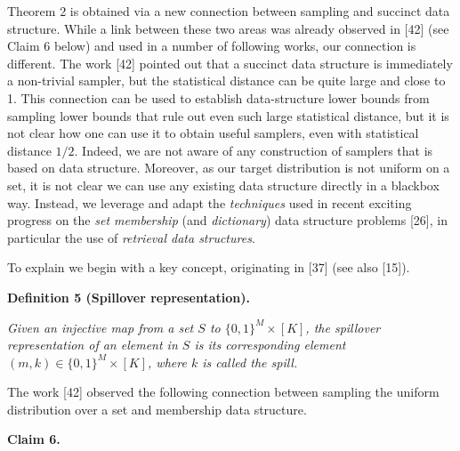 \documentclass[10pt,a4paper]{article}
\begin{document}
Theorem 2 is obtained via a new connection between sampling and succinct data structure. While a link between these two areas was already observed in [42] (see Claim 6 below) and used in a number of following works, our connection is different.
The work [42] pointed out that a succinct data structure is immediately a non-trivial sampler, but the statistical distance can be quite large and close to 1. This connection can be used to establish data-structure lower bounds from sampling lower bounds that rule out even such large statistical distance, but it is not clear how one can use it to obtain useful samplers, even with statistical distance $1/2$. Indeed, we are not aware of any construction of samplers that is based on data structure. Moreover, as our target distribution is not uniform on a set, it is not clear we can use any existing data structure directly in a blackbox way. Instead, we leverage and adapt the \emph{techniques} used in recent exciting progress on the \emph{set membership} (and \emph{dictionary}) data structure problems [26], in particular the use of \emph{retrieval data structures}.\par




To explain we begin with a key concept, originating in [37] (see also [15]).\par





\par\medskip\noindent\textbf{
\textbf{Definition 5}\textbf{ }(Spillover representation)\textbf{.}
}\par



\emph{Given an injective map from a set $S$ to $\{0,1\}^{M}\times[K]$, the spillover representation of an element in $S$ is its corresponding element $(m,k)\in\{0,1\}^{M}\times[K]$, where $k$ is called the spill.}\par






The work [42] observed the following connection between sampling the uniform distribution over a set and membership data structure.\par





\par\medskip\noindent\textbf{
Claim 6. 
}\par
\end{document}
